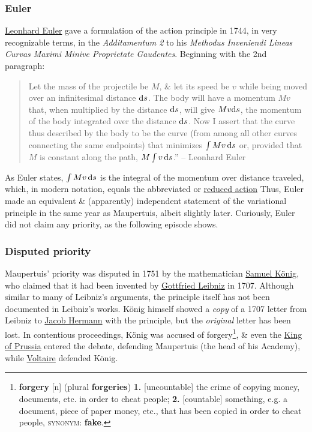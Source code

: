 \documentclass[oneside]{book}
\numberwithin{equation}{section}
\begin{document}
\subsubsection{Euler}
\href{https://en.wikipedia.org/wiki/Leonhard_Euler}{Leonhard Euler} gave a formulation of the action principle in 1744, in very recognizable terms, in the \textit{Additamentum 2} to his \textit{Methodus Inveniendi Lineas Curvas Maximi Minive Proprietate Gaudentes}. Beginning with the 2nd paragraph:
\begin{quotation}
	Let the mass of the projectile be $M$, \& let its speed be $v$ while being moved over an infinitesimal distance ${\rm d}s$. The body will have a momentum $Mv$ that, when multiplied by the distance ${\rm d}s$, will give $Mv{\rm d}s$, the momentum of the body integrated over the distance ${\rm d}s$. Now I assert that the curve thus described by the body to be the curve (from among all other curves connecting the same endpoints) that minimizes $\int Mv\,{\rm d}s$ or, provided that $M$ is constant along the path, $M\int v\,{\rm d}s$.'' -- Leonhard Euler
\end{quotation}
As Euler states, $\int Mv\,{\rm d}s$ is the integral of the momentum over distance traveled, which, in modern notation, equals the abbreviated or \href{https://en.wikipedia.org/wiki/Reduced_action}{reduced action}  Thus, Euler made an equivalent \& (apparently) independent statement of the variational principle in the same year as Maupertuis, albeit slightly later. Curiously, Euler did not claim any priority, as the following episode shows.

\subsubsection{Disputed priority}
Maupertuis' priority was disputed in 1751 by the mathematician \href{https://en.wikipedia.org/wiki/Samuel_K%C3%B6nig}{Samuel K\"onig}, who claimed that it had been invented by \href{https://en.wikipedia.org/wiki/Gottfried_Leibniz}{Gottfried Leibniz} in 1707. Although similar to many of Leibniz's arguments, the principle itself has not been documented in Leibniz's works. K\"onig himself showed a \textit{copy} of a 1707 letter from Leibniz to \href{https://en.wikipedia.org/wiki/Jacob_Hermann_(mathematician)}{Jacob Hermann} with the principle, but the \textit{original} letter has been lost. In contentious proceedings, K\"onig was accused of forgery\footnote{\textbf{forgery} [n] (plural \textbf{forgeries}) \textbf{1.} [uncountable] the crime of copying money, documents, etc. in order to cheat people; \textbf{2.} [countable] something, e.g. a document, piece of paper money, etc., that has been copied in order to cheat people, \textsc{synonym}: \textbf{fake}.}, \& even the \href{https://en.wikipedia.org/wiki/Frederick_the_Great}{King of Prussia} entered the debate, defending Maupertuis (the head of his Academy), while \href{https://en.wikipedia.org/wiki/Voltaire}{Voltaire} defended K\"onig.
\end{document}
